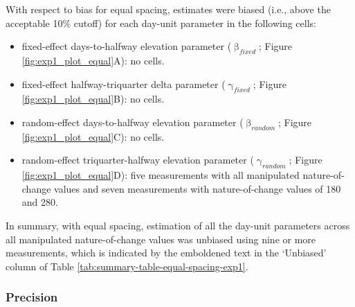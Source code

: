 \documentclass[
12pt, %
twoside,
english]{guelphthesis}
\begin{document}
With respect to bias for equal spacing, estimates were biased (i.e., above the acceptable 10\% cutoff) for each day-unit parameter in the following cells:
\begin{itemize}
\tightlist
\item
  fixed-effect days-to-halfway elevation parameter (\(\upbeta_{fixed}\); Figure \ref{fig:exp1_plot_equal}A): no cells.
\item
  fixed-effect halfway-triquarter delta parameter (\(\upgamma_{fixed}\); Figure \ref{fig:exp1_plot_equal}B): no cells.
\item
  random-effect days-to-halfway elevation parameter (\(\upbeta_{random}\); Figure \ref{fig:exp1_plot_equal}C): no cells.
\item
  random-effect triquarter-halfway elevation parameter (\(\upgamma_{random}\); Figure \ref{fig:exp1_plot_equal}D): five measurements with all manipulated nature-of-change values and seven measurements with nature-of-change values of 180 and 280.
\end{itemize}
In summary, with equal spacing, estimation of all the day-unit parameters across all manipulated nature-of-change values was unbiased using nine or more measurements, which is indicated by the emboldened text in the `Unbiased' column of Table \ref{tab:summary-table-equal-spacing-exp1}.

\hypertarget{precision-equal-exp1}{%
\subsubsection{Precision}\label{precision-equal-exp1}}
\end{document}
